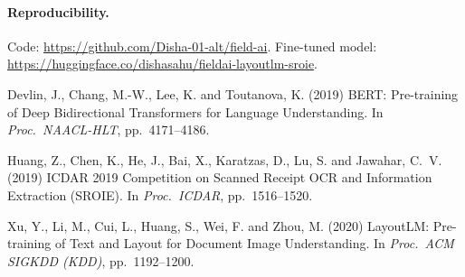 \documentclass[11pt]{article}
\begin{document}
\paragraph{Reproducibility.}
Code: \url{https://github.com/Disha-01-alt/field-ai}. \;
Fine-tuned model: \url{https://huggingface.co/dishasahu/fieldai-layoutlm-sroie}.

\begin{thebibliography}{}
Devlin, J., Chang, M.-W., Lee, K. and Toutanova, K. (2019)
BERT: Pre-training of Deep Bidirectional Transformers for Language Understanding.
In \textit{Proc.\ NAACL-HLT}, pp.~4171--4186.

Huang, Z., Chen, K., He, J., Bai, X., Karatzas, D., Lu, S. and Jawahar, C.~V. (2019)
ICDAR 2019 Competition on Scanned Receipt OCR and Information Extraction (SROIE).
In \textit{Proc.\ ICDAR}, pp.~1516--1520.

Xu, Y., Li, M., Cui, L., Huang, S., Wei, F. and Zhou, M. (2020)
LayoutLM: Pre-training of Text and Layout for Document Image Understanding.
In \textit{Proc.\ ACM SIGKDD (KDD)}, pp.~1192--1200.
\end{thebibliography}
\end{document}
